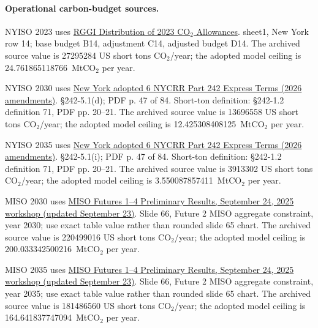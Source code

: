 \documentclass[pdflatex,sn-nature]{sn-jnl}
\begin{document}
\begin{appendices}
\paragraph{Operational carbon-budget sources.}

NYISO 2023 uses \href{https://www.rggi.org/sites/default/files/Uploads/Allowance-Tracking/2023\_Allowance-Distribution.xlsx}{RGGI Distribution of 2023 CO$_2$ Allowances}. sheet1, New York row 14; base budget B14, adjustment C14, adjusted budget D14. The archived source value is 27295284 US short tons CO$_2$/year; the adopted model ceiling is 24.761865118766~MtCO$_2$ per year.\par

NYISO 2030 uses \href{https://dec.ny.gov/sites/default/files/2026-08/part242\_et\_adopted.pdf}{New York adopted 6 NYCRR Part 242 Express Terms (2026 amendments)}. \S{}242-5.1(d); PDF p. 47 of 84. Short-ton definition: \S{}242-1.2 definition 71, PDF pp. 20--21. The archived source value is 13696558 US short tons CO$_2$/year; the adopted model ceiling is 12.425308408125~MtCO$_2$ per year.\par

NYISO 2035 uses \href{https://dec.ny.gov/sites/default/files/2026-08/part242\_et\_adopted.pdf}{New York adopted 6 NYCRR Part 242 Express Terms (2026 amendments)}. \S{}242-5.1(i); PDF p. 47 of 84. Short-ton definition: \S{}242-1.2 definition 71, PDF pp. 20--21. The archived source value is 3913302 US short tons CO$_2$/year; the adopted model ceiling is 3.550087857411~MtCO$_2$ per year.\par

MISO 2030 uses \href{https://cdn.misoenergy.org/20250924\%20Workshop\%20Item\%2002\%20Futures\%201-4\%20Preliminary\%20Results\%20update\%2020250923719306.pdf}{MISO Futures 1--4 Preliminary Results, September 24, 2025 workshop (updated September 23)}. Slide 66, Future 2 MISO aggregate constraint, year 2030; use exact table value rather than rounded slide 65 chart. The archived source value is 220499016 US short tons CO$_2$/year; the adopted model ceiling is 200.033342500216~MtCO$_2$ per year.\par

MISO 2035 uses \href{https://cdn.misoenergy.org/20250924\%20Workshop\%20Item\%2002\%20Futures\%201-4\%20Preliminary\%20Results\%20update\%2020250923719306.pdf}{MISO Futures 1--4 Preliminary Results, September 24, 2025 workshop (updated September 23)}. Slide 66, Future 2 MISO aggregate constraint, year 2035; use exact table value rather than rounded slide 65 chart. The archived source value is 181486560 US short tons CO$_2$/year; the adopted model ceiling is 164.641837747094~MtCO$_2$ per year.\par


\end{appendices}
\end{document}
